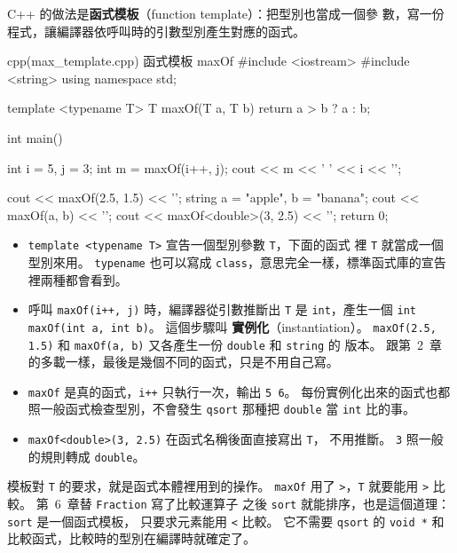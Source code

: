 C++ 的做法是\textbf{函式模板}（function template）：把型別也當成一個參
數，寫一份程式，讓編譯器依呼叫時的引數型別產生對應的函式。

\begin{example}[label=ex:max-template]{cpp}{(max\_template.cpp) 函式模板 maxOf}
#include <iostream>
#include <string>
using namespace std;

template <typename T>
T maxOf(T a, T b) {
    return a > b ? a : b;
}

int main() {
    int i = 5, j = 3;
    int m = maxOf(i++, j);
    cout << m << ' ' << i << '\n';

    cout << maxOf(2.5, 1.5) << '\n';
    string a = "apple", b = "banana";
    cout << maxOf(a, b) << '\n';
    cout << maxOf<double>(3, 2.5) << '\n';
    return 0;
}
\end{example}


\begin{itemize}
\item \texttt{template <typename T>} 宣告一個型別參數 \texttt{T}，下面的函式
裡 \texttt{T} 就當成一個型別來用。 \texttt{typename} 也可以寫成
\texttt{class}，意思完全一樣，標準函式庫的宣告裡兩種都會看到。
\item 呼叫 \texttt{maxOf(i++, j)} 時，編譯器從引數推斷出 \texttt{T} 是
\texttt{int}，產生一個 \texttt{int maxOf(int a, int b)}。 這個步驟叫
\textbf{實例化}（instantiation）。 \texttt{maxOf(2.5, 1.5)} 和
\texttt{maxOf(a, b)} 又各產生一份 \texttt{double} 和 \texttt{string} 的
版本。 跟第~2~章的多載一樣，最後是幾個不同的函式，只是不用自己寫。
\item \texttt{maxOf} 是真的函式，\texttt{i++} 只執行一次，輸出
\texttt{5 6}。 每份實例化出來的函式也都照一般函式檢查型別，不會發生
\texttt{qsort} 那種把 \texttt{double} 當 \texttt{int} 比的事。
\item \texttt{maxOf<double>(3, 2.5)} 在函式名稱後面直接寫出 \texttt{T}，
不用推斷。 \texttt{3} 照一般的規則轉成 \texttt{double}。
\end{itemize}

模板對 \texttt{T} 的要求，就是函式本體裡用到的操作。 \texttt{maxOf} 用了
\texttt{>}，\texttt{T} 就要能用 \texttt{>} 比較。 第~6~章替 \texttt{Fraction} 寫了比較運算子
之後 \texttt{sort} 就能排序，也是這個道理：\texttt{sort} 是一個函式模板，
只要求元素能用 \texttt{<} 比較。 它不需要 \texttt{qsort} 的
\texttt{void *} 和比較函式，比較時的型別在編譯時就確定了。

